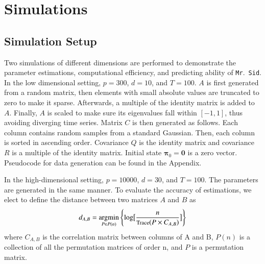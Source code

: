 \documentclass[times,twocolumn,final,authoryear]{elsarticle}
\newcommand{\mrsid}{{\sc \texttt{Mr}.~\texttt{Sid}}}
\newcommand{\argmin}{\operatornamewithlimits{argmin}}
\begin{document}
\section{Simulations}
\subsection{Simulation Setup}
\label{sec:simsetup}
Two simulations of different dimensions are performed to demonstrate the parameter estimations, computational efficiency, and predicting ability of \mrsid.
In the low dimensional setting, $p = 300$, $d = 10$, and $T = 100$. $A$ is first generated from a random matrix, then elements with small absolute values are truncated to zero to make it sparse. Afterwards, a multiple of the identity matrix is added to $A$. Finally, $A$ is scaled to make sure its eigenvalues fall within $[-1,1]$, thus avoiding diverging time series. Matrix $C$ is then generated as follows. Each column contains random samples from a standard Gaussian. Then, each column is sorted in ascending order. Covariance $Q$ is the identity matrix and covariance $R$ is a multiple of the identity matrix. Initial state $\mathbf{\pi}_0 = \mathbf{0}$ is a zero vector. Pseudocode for data generation can be found in the Appendix.

In the high-dimensional setting, $p = 10000$, $d = 30$, and $T = 100$. The parameters are generated in the same manner. To evaluate the accuracy of estimations, we elect to define the distance between two matrices $A$ and $B$ as
\begin{equation}\label{eq:distance}
d_{A,B} = \argmin_{P\in P(n)}\left\{\log\bigl[\frac{n}{\text{\footnotesize Trace}(P\times C_{A,B})}\bigr]\right\}
\end{equation}
where $C_{A,B}$ is the correlation matrix between columns of A and B, $P(n)$ is a collection of all the permutation matrices of order n, and $P$ is a permutation matrix.
\end{document}
